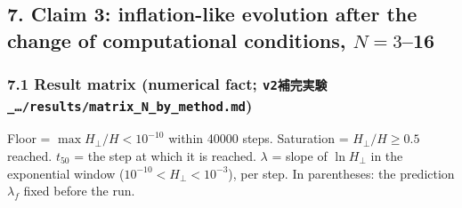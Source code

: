 \documentclass[
  10pt,
  a4paper,
]{article}
\begin{document}
\subsection{\texorpdfstring{7. Claim 3: inflation-like evolution after
the change of computational conditions,
\(N=3\)--16}{7. Claim 3: inflation-like evolution after the change of computational conditions, N=3--16}}\label{claim-3-inflation-like-evolution-after-the-change-of-computational-conditions-n316}

\subsubsection{\texorpdfstring{7.1 Result matrix (numerical fact;
\texttt{v2補完実験\_…/results/matrix\_N\_by\_method.md})}{7.1 Result matrix (numerical fact; v2補完実験\_\ldots/results/matrix\_N\_by\_method.md)}}\label{result-matrix-numerical-fact-v2ux88dcux5b8cux5b9fux9a13_resultsmatrix_n_by_method.md}

Floor = \(\max H_\perp/H<10^{-10}\) within 40000 steps. Saturation =
\(H_\perp/H\ge0.5\) reached. \(t_{50}\) = the step at which it is
reached. \(\lambda\) = slope of \(\ln H_\perp\) in the exponential
window (\(10^{-10}<H_\perp<10^{-3}\)), per step. In parentheses: the
prediction \(\lambda_f\) fixed before the run.
\end{document}
